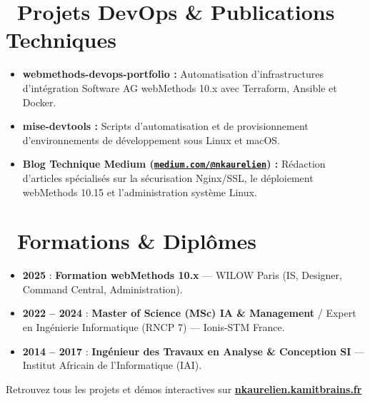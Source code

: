 \documentclass[10pt,a4paper]{article}
\begin{document}
\section{\faRocket\ Projets DevOps \& Publications Techniques}
\begin{itemize}[leftmargin=1.4em, itemsep=0.25em, topsep=0.15em]
    \item \textbf{webmethods-devops-portfolio :} Automatisation d'infrastructures d'intégration Software AG webMethods 10.x avec Terraform, Ansible et Docker.
    \item \textbf{mise-devtools :} Scripts d'automatisation et de provisionnement d'environnements de développement sous Linux et macOS.
    \item \textbf{Blog Technique Medium (\href{https://medium.com/@nkaurelien}{\texttt{medium.com/@nkaurelien}}) :} Rédaction d'articles spécialisés sur la sécurisation Nginx/SSL, le déploiement webMethods 10.15 et l'administration système Linux.
\end{itemize}

\section{\faGraduationCap\ Formations \& Diplômes}
\begin{itemize}[leftmargin=1.4em, itemsep=0.25em, topsep=0.15em]
    \item \textbf{2025} : \textbf{Formation webMethods 10.x} --- WILOW Paris (IS, Designer, Command Central, Administration).
    \item \textbf{2022 -- 2024} : \textbf{Master of Science (MSc) IA \& Management} / Expert en Ingénierie Informatique (RNCP 7) --- Ionis-STM France.
    \item \textbf{2014 -- 2017} : \textbf{Ingénieur des Travaux en Analyse \& Conception SI} --- Institut Africain de l'Informatique (IAI).
\end{itemize}

\vspace{0.8em}
\begin{center}
    \footnotesize\color{slateGray}
    Retrouvez tous les projets et démos interactives sur \href{https://nkaurelien.kamitbrains.fr}{\textbf{nkaurelien.kamitbrains.fr}}
\end{center}
\end{document}
